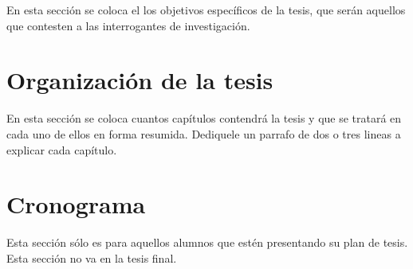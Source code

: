 En esta sección se coloca el los objetivos específicos de la tesis, que serán aquellos que contesten a las
interrogantes de investigación.

\section{Organización de la tesis}

En esta sección se coloca cuantos capítulos contendrá la tesis y que se tratará en cada uno de
ellos en forma resumida. Dediquele un parrafo de dos o tres lineas a explicar cada capítulo.

\section{Cronograma}

Esta sección sólo es para aquellos alumnos que estén presentando su plan de tesis. Esta sección no va
en la tesis final.
